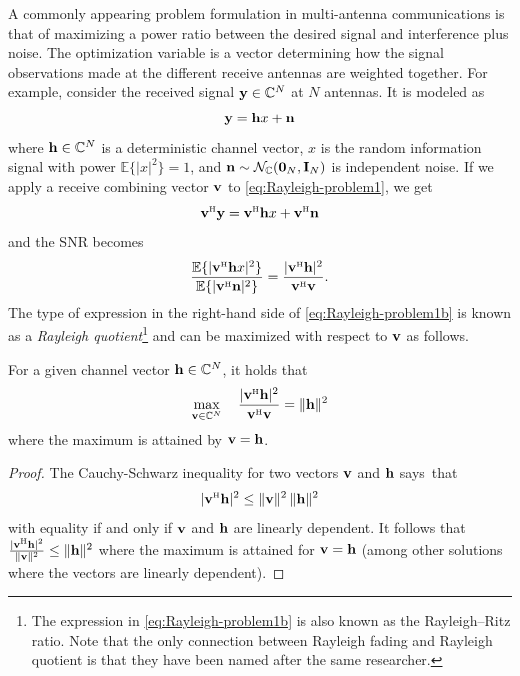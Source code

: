 A commonly appearing problem formulation in multi-antenna communications is that of maximizing a power ratio between the desired signal and interference plus noise. The optimization variable is a vector determining how the signal observations made at the different receive antennas are weighted together. For example, consider the received signal $\mathbf{y} \in \mathbb{C}^N$ at $N$ antennas. It is modeled as
\begin{equation} \label{eq:Rayleigh-problem1}
\mathbf{y} = \mathbf{h} x + \mathbf{n}
\end{equation}
where $\mathbf{h}  \in \mathbb{C}^N$ is a deterministic channel vector, $x$ is the random information signal with power $\mathbb{E}\{ |x|^2\} = 1$, and $\mathbf{n}\sim \mathcal{N}_{\mathbb{C}}(\mathbf{0}_N,\mathbf{I}_N)$ is independent noise.
If we apply a receive combining vector $\mathbf{v}$ to \eqref{eq:Rayleigh-problem1}, we get
\begin{equation}
\vect{v}^{\Htran} \vect{y} =  \vect{v}^{\Htran} \vect{h} x +\vect{v}^{\Htran}  \vect{n}
\end{equation}
and the \gls{SNR} becomes
\begin{equation} \label{eq:Rayleigh-problem1b}
\frac{ \mathbb{E}\{ | \vect{v}^{\Htran} \vect{h} x  |^2 \} }{ \mathbb{E}\{ | \vect{v}^{\Htran}  \vect{n}  |^2 \} } = \frac{ | \vect{v}^{\Htran} \vect{h}  |^2  }{\vect{v}^{\Htran} \vect{v} }.
\end{equation}
The type of expression in the right-hand side of  \eqref{eq:Rayleigh-problem1b} is known as a \emph{Rayleigh quotient}\footnote{The expression in \eqref{eq:Rayleigh-problem1b} is also known as the Rayleigh--Ritz ratio. Note that the only connection between Rayleigh fading and Rayleigh quotient is that they have been named after the same researcher.} and can be maximized with respect to $\mathbf{v}$ as follows.

\begin{lemma} \label{lemma:max-Rayleigh-quotient}
For a given channel vector $\mathbf{h} \in \mathbb{C}^{N}$, it holds that 
\begin{equation}
\max_{\vect{v} \in \mathbb{C}^N} \quad \frac{  |  \vect{v}^{\Htran} \vect{h} |^2  }{ \vect{v}^{\Htran}  \vect{v}} = \| \vect{h} \|^2
\end{equation}
where the maximum is attained by $\mathbf{v} = \mathbf{h}$.
\end{lemma}
\begin{proof}
The Cauchy-Schwarz inequality for two vectors $\mathbf{v}$ and $\mathbf{h}$ says~that \begin{equation}
| \vect{v}^{\Htran} \vect{h} |^2 \leq \| \vect{v} \|^2 \, \| \vect{h} \|^2
\end{equation}
with equality if and only if $\mathbf{v}$ and $\mathbf{h}$ are linearly dependent. It follows that $\frac{| \vect{v}^{\Htran} \vect{h} |^2}{\| \vect{v} \|^2 } \leq  \| \vect{h} \|^2$ where the maximum is attained for $\mathbf{v} = \mathbf{h}$ (among other solutions where the vectors are linearly dependent).
\end{proof}

